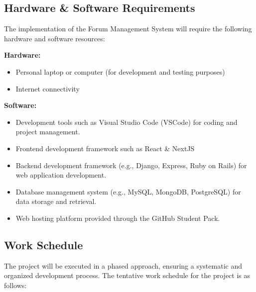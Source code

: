 \documentclass[twocolumn,10pt]{article}
\begin{document}
\subsection{Hardware \& Software Requirements}
The implementation of the Forum Management System will require the following hardware and software resources:


\textbf{Hardware:}
\begin{itemize}
\item Personal laptop or computer (for development and testing purposes)
\item Internet connectivity
\end{itemize}

\textbf{Software:}

\begin{itemize}
\item Development tools such as Visual Studio Code (VSCode) for coding and project management.
\item Frontend development framework such as React \& NextJS
\item Backend development framework (e.g., Django, Express, Ruby on Rails) for web application development.
\item Database management system (e.g., MySQL, MongoDB, PostgreSQL) for data storage and retrieval.
\item Web hosting platform provided through the GitHub Student Pack.
\end{itemize}
\subsection{Work Schedule}
The project will be executed in a phased approach, ensuring a systematic and organized development process. The tentative work schedule for the project is as follows:
\end{document}
